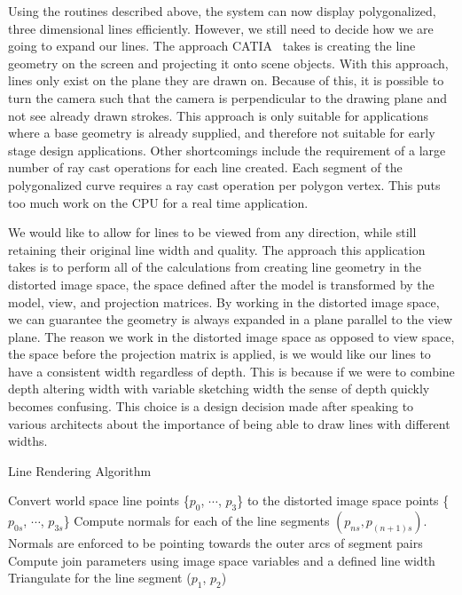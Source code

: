 Using the routines described above, the system can now display polygonalized, three dimensional lines efficiently.
However, we still need to decide how we are going to expand our lines.
The approach CATIA~\autocite{catia} takes is creating the line geometry on the screen and projecting it onto scene objects. 
With this approach, lines only exist on the plane they are drawn on. Because of this, it is possible to turn the camera such that the camera is perpendicular to the drawing plane and not see already drawn strokes.
This approach is only suitable for applications where a base geometry is already supplied, and therefore not suitable for early stage design applications. 
Other shortcomings include the requirement of a large number of ray cast operations for each line created.
Each segment of the polygonalized curve requires a ray cast operation per polygon vertex. 
This puts too much work on the CPU for a real time application.

We would like to allow for lines to be viewed from any direction, while still retaining their original line width and quality.
The approach this application takes is to perform all of the calculations from creating line geometry in the distorted image space, the space defined after the model is transformed by the model, view, and projection matrices.
By working in the distorted image space, we can guarantee the geometry is always expanded in a plane parallel to the view plane.
The reason we work in the distorted image space as opposed to view space, the space before the projection matrix is applied, is we would like our lines to have a consistent width regardless of depth.
This is because if we were to combine depth altering width with variable sketching width the sense of depth quickly becomes confusing.
This choice is a design decision made after speaking to various architects about the importance of being able to draw lines with different widths.

\begin{algorithm}[H]
\caption{Line Rendering Algorithm}
\begin{algorithmic}[1]
\State Convert world space line points \{$p_0$, $\cdots$, $p_3$\} to the distorted image space points \{$p_{0s}$, $\cdots$, $p_{3s}$\}
\State Compute normals for each of the line segments $(p_{ns},p_{(n+1)s})$. Normals are enforced to be pointing towards the outer arcs of segment pairs
\State Compute join parameters using image space variables and a defined line width
\State Triangulate for the line segment ($p_1$, $p_2$)
\EndFor
\end{algorithmic}
\end{algorithm}

